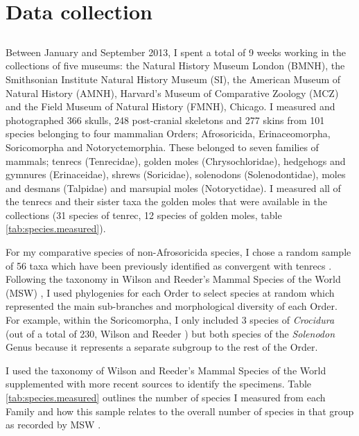 \section{Data collection}
\label{sect:datacollection}


\subsection{}

	Between January and September 2013, I spent a total of 9 weeks working in the collections of five museums: the Natural History Museum London (BMNH), the Smithsonian Institute Natural History Museum (SI), the American Museum of Natural History (AMNH), Harvard's Museum of Comparative Zoology (MCZ) and the Field Museum of Natural History (FMNH), Chicago. I measured and photographed 366 skulls, 248 post-cranial skeletons and 277 skins from 101 species belonging to four mammalian Orders; Afrosoricida, Erinaceomorpha, Soricomorpha and Notoryctemorphia. 
	These belonged to seven families of mammals; tenrecs (Tenrecidae), golden moles (Chrysochloridae), hedgehogs and gymnures (Erinaceidae), shrews (Soricidae), solenodons (Solenodontidae), moles and desmans (Talpidae) and marsupial moles (Notoryctidae).
	I measured all of the tenrecs and their sister taxa the golden moles that were available in the collections (31 species of tenrec, 12 species of golden moles, table \ref{tab:species.measured}).
	
	For my comparative species of non-Afrosoricida species, I chose a random sample of 56 taxa 
	which have been previously identified as convergent with tenrecs \citep[e.g.][]{Gould1966, Symonds2005, Poux2008, Olson2013}. Following the taxonomy in Wilson and Reeder's Mammal Species of the World (MSW) \citeyearpar{Wilson2005}, I used phylogenies for each Order to select species at random which represented the main sub-branches and morphological diversity of each Order. For example, within the Soricomorpha, I only included 3 %
	species of \textit{Crocidura} (out of a total of 230, Wilson and Reeder \citeyear{Wilson2005}) but both species of the \textit{Solenodon} Genus because it represents a separate subgroup to the rest of the Order. 

	I used the taxonomy of Wilson and Reeder's Mammal Species of the World \citeyearpar[MSW,][]{Wilson2005} supplemented with more recent sources \citep[e.g.][]{Olson2013, Soarimalala2011} to identify the specimens. Table \ref{tab:species.measured} outlines the number of species I measured from each Family and how this sample relates to the overall number of species in that group as recorded by MSW \citeyearpar{Wilson2005}.

